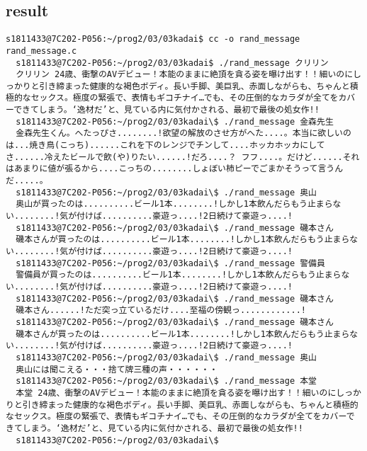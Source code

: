 \documentclass[10pt,a4paper]{jsarticle}
\begin{document}
\subsection{result}
\begin{lstlisting}[basicstyle=\ttfamily\footnotesize,frame=single]
  s1811433@7C202-P056:~/prog2/03/03kadai$ cc -o rand_message rand_message.c
  s1811433@7C202-P056:~/prog2/03/03kadai$ ./rand_message クリリン
  クリリン 24歳、衝撃のAVデビュー！本能のままに絶頂を貪る姿を曝け出す！！細いのにしっかりと引き締まった健康的な褐色ボディ。長い手脚、美巨乳、赤面しながらも、ちゃんと積極的なセックス。極度の緊張で、表情もギコチナイ…でも、その圧倒的なカラダが全てをカバーできてしまう。‘逸材だ’と、見ている内に気付かされる、最初で最後の処女作!!
  s1811433@7C202-P056:~/prog2/03/03kadai\$ ./rand_message 金森先生
  金森先生くん。へたっぴさ........!欲望の解放のさせ方がへた....。本当に欲しいのは...焼き鳥(こっち)......これを下のレンジでチンして....ホッカホッカにしてさ......冷えたビールで飲(や)りたい......!だろ....？ フフ....。だけど......それはあまりに値が張るから....こっちの........しょぼい柿ピーでごまかそうって言うんだ.....。
  s1811433@7C202-P056:~/prog2/03/03kadai\$ ./rand_message 奥山
  奥山が買ったのは..........ビール1本........!しかし1本飲んだらもう止まらない........!気が付けば..........豪遊っ....!2日続けて豪遊っ....!
  s1811433@7C202-P056:~/prog2/03/03kadai\$ ./rand_message 磯本さん
  磯本さんが買ったのは..........ビール1本........!しかし1本飲んだらもう止まらない........!気が付けば..........豪遊っ....!2日続けて豪遊っ....!
  s1811433@7C202-P056:~/prog2/03/03kadai\$ ./rand_message 警備員
  警備員が買ったのは..........ビール1本........!しかし1本飲んだらもう止まらない........!気が付けば..........豪遊っ....!2日続けて豪遊っ....!
  s1811433@7C202-P056:~/prog2/03/03kadai\$ ./rand_message 磯本さん
  磯本さん......!ただ突っ立ているだけ....至福の傍観っ............!
  s1811433@7C202-P056:~/prog2/03/03kadai\$ ./rand_message 磯本さん
  磯本さんが買ったのは..........ビール1本........!しかし1本飲んだらもう止まらない........!気が付けば..........豪遊っ....!2日続けて豪遊っ....!
  s1811433@7C202-P056:~/prog2/03/03kadai\$ ./rand_message 奥山
  奥山には聞こえる・・・捨て牌三種の声・・・・・・
  s1811433@7C202-P056:~/prog2/03/03kadai\$ ./rand_message 本堂
  本堂 24歳、衝撃のAVデビュー！本能のままに絶頂を貪る姿を曝け出す！！細いのにしっかりと引き締まった健康的な褐色ボディ。長い手脚、美巨乳、赤面しながらも、ちゃんと積極的なセックス。極度の緊張で、表情もギコチナイ…でも、その圧倒的なカラダが全てをカバーできてしまう。‘逸材だ’と、見ている内に気付かされる、最初で最後の処女作!!
  s1811433@7C202-P056:~/prog2/03/03kadai\$
  
\end{lstlisting}
\end{document}
